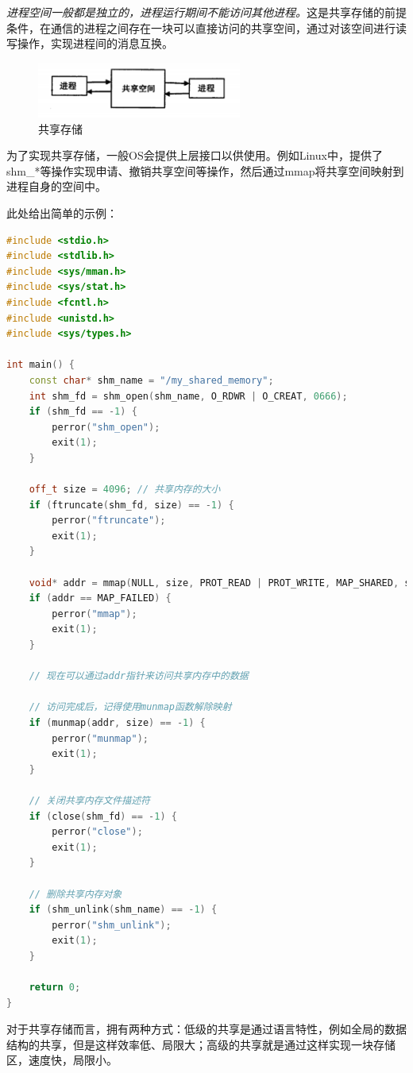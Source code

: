     \emph{进程空间一般都是独立的，进程运行期间不能访问其他进程。}这是共享存储的前提条件，在通信的进程之间存在一块可以直接访问的共享空间，通过对该空间进行读写操作，实现进程间的消息互换。

\begin{figure}[!htbp]
    \centering
    \includegraphics[width=0.6\textwidth]{image/chapter02/共享空间.png}
    \caption{共享存储}
\end{figure}

    为了实现共享存储，一般OS会提供上层接口以供使用。例如Linux中，提供了shm\_*等操作实现申请、撤销共享空间等操作，然后通过mmap将共享空间映射到进程自身的空间中。

    此处给出简单的示例：

\begin{lstlisting}[language=C++]
#include <stdio.h>
#include <stdlib.h>
#include <sys/mman.h>
#include <sys/stat.h>
#include <fcntl.h>
#include <unistd.h>
#include <sys/types.h>

int main() {
    const char* shm_name = "/my_shared_memory";
    int shm_fd = shm_open(shm_name, O_RDWR | O_CREAT, 0666);
    if (shm_fd == -1) {
        perror("shm_open");
        exit(1);
    }

    off_t size = 4096; // 共享内存的大小
    if (ftruncate(shm_fd, size) == -1) {
        perror("ftruncate");
        exit(1);
    }

    void* addr = mmap(NULL, size, PROT_READ | PROT_WRITE, MAP_SHARED, shm_fd, 0);
    if (addr == MAP_FAILED) {
        perror("mmap");
        exit(1);
    }

    // 现在可以通过addr指针来访问共享内存中的数据

    // 访问完成后，记得使用munmap函数解除映射
    if (munmap(addr, size) == -1) {
        perror("munmap");
        exit(1);
    }

    // 关闭共享内存文件描述符
    if (close(shm_fd) == -1) {
        perror("close");
        exit(1);
    }

    // 删除共享内存对象
    if (shm_unlink(shm_name) == -1) {
        perror("shm_unlink");
        exit(1);
    }

    return 0;
}
\end{lstlisting}

    对于共享存储而言，拥有两种方式：低级的共享是通过语言特性，例如全局的数据结构的共享，但是这样效率低、局限大；高级的共享就是通过这样实现一块存储区，速度快，局限小。

